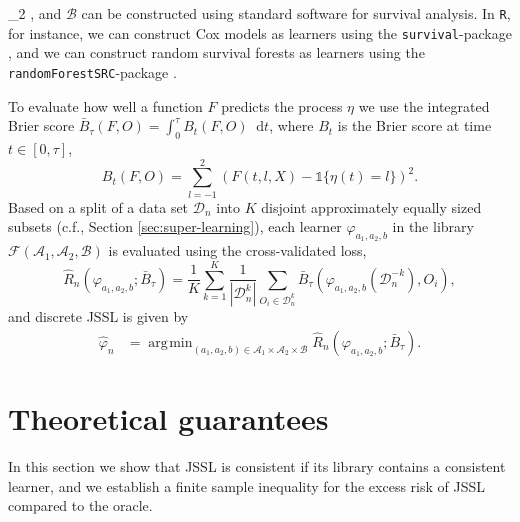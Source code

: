 \documentclass[a4paper,danish]{article}
\theoremstyle{plain} %
\numberwithin{theorem}{section}
\theoremstyle{definition} %
\theoremstyle{remark}
\renewcommand{\phi}{\varphi}
\newcommand*\diff{\mathop{}\!\mathrm{d}}
\newcommand{\1}{\mathds{1}}
\DeclareMathOperator*{\argmin}{\arg\!\min}
\newcommand{\data}{\ensuremath{\mathcal{D}}}
\begin{document}
_2 \), and \( \mathcal{B} \) can be constructed using
standard software for survival analysis. In
\texttt{R}, for instance, we can construct Cox models as
learners using the \texttt{survival}-package
\citep{survival-package}, and we can construct random survival
forests as learners using the \texttt{randomForestSRC}-package \citep{randomForestSRC}.

To evaluate how well a function \( F \) predicts the
process $\eta$ we use the integrated Brier score \citep{graf1999assessment}
\( \bar B_\tau( F,O) = \int_0^{\tau} B_t(F,O) \diff t \),
where \( B_t \) is the Brier score
\citep{brier1950verification} at time \( t \in [0, \tau] \),
\begin{equation*}
  B_t(F,O) = \sum_{l=-1}^{2}
  \left(
      F(t,l,X) - \1{\{\eta(t)=l\}}
  \right)^2.
\end{equation*}
Based on a split of a data set \(\data_n\) into $K$ disjoint
approximately equally sized subsets (c.f., Section
\ref{sec:super-learning}), each learner
\( \phi_{a_1, a_2, b} \) in the library
\( \mathcal{F}(\mathcal{A}_1, \mathcal{A}_2, \mathcal{B}) \)
is evaluated using the cross-validated loss,
\begin{equation*}
  \hat{R}_{n}(\phi_{a_1,a_2,b} ; \bar{B}_{\tau}) =
  \frac{1}{K}\sum_{k=1}^{K}
  \frac{1}{| \data_n^{k} |}\sum_{O_i \in \data_n^{k}}
  \bar B_\tau
  {
    \left(
      \phi_{a_1,a_2,b}{ (\data_n^{-k})}
      , O_i
    \right)
  },
\end{equation*}
and discrete JSSL is given by
\begin{align*}\label{eq:discrete-state-learner}
  \hat{\phi}_n
  &=  \argmin_{(a_1,a_2,b)\in \mathcal{A}_1\times\mathcal{A}_2\times\mathcal{B}}
    \hat{R}_{n}(\phi_{a_1,a_2,b} ; \bar{B}_{\tau}).
\end{align*}




\section{Theoretical guarantees}
\label{sec:theor-results-prop}

In this section we show that JSSL is consistent if its
library contains a consistent learner, and we establish a finite
sample inequality for the excess risk of JSSL compared to
the oracle.
\end{document}
